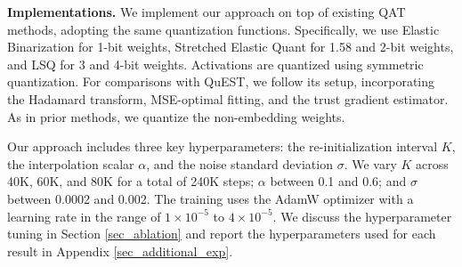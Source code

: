 \documentclass{article}
\theoremstyle{definition}
\begin{document}
\textbf{Implementations.} We implement our approach on top of existing QAT methods, adopting the same quantization functions. Specifically, we use Elastic Binarization \citep{liu2022bit} for 1-bit weights, Stretched Elastic Quant \citep{liu2025paretoq} for 1.58 and 2-bit weights, and LSQ \citep{esser2020learned} for 3 and 4-bit weights. Activations are quantized using symmetric quantization. For comparisons with QuEST, we follow its setup, incorporating the Hadamard transform, MSE-optimal fitting, and the trust gradient estimator. As in prior methods, we quantize the non-embedding weights. 

Our approach includes three key hyperparameters: the re-initialization interval $K$, the interpolation scalar $\alpha$, and the noise standard deviation $\sigma$. We vary $K$ across 40K, 60K, and 80K for a total of 240K steps; $\alpha$ between 0.1 and 0.6; and $\sigma$ between 0.0002 and 0.002. The training uses the AdamW optimizer with a learning rate in the range of $1\times10^{-5}$ to $4\times10^{-5}$. We discuss the hyperparameter tuning in Section \ref{sec_ablation} and report the hyperparameters used for each result in Appendix \ref{sec_additional_exp}. 
\end{document}
